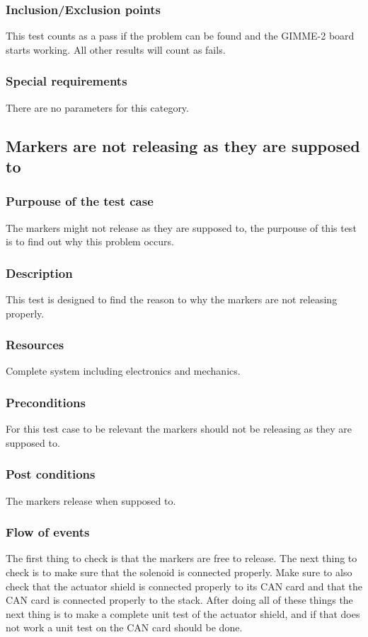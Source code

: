 \documentclass[10pt,a4paper]{article}
\begin{document}
\subsubsection*{Inclusion/Exclusion points}
This test counts as a pass if the problem can be found and the GIMME-2 board starts working. All other results will count as fails. 
\subsubsection*{Special requirements}
There are no parameters for this category. 

\subsection{Markers are not releasing as they are supposed to}
\subsubsection*{Purpouse of the test case}
The markers might not release as they are supposed to, the purpouse of this test is to find out why this problem occurs. 
\subsubsection*{Description}
This test is designed to find the reason to why the markers are not releasing properly. 
\subsubsection*{Resources}
Complete system including electronics and mechanics.  
\subsubsection*{Preconditions}
For this test case to be relevant the markers should not be releasing as they are supposed to. 
\subsubsection*{Post conditions}
The markers release when supposed to. 
\subsubsection*{Flow of events}
The first thing to check is that the markers are free to release. The next thing to check is to make sure that the solenoid is connected properly. Make sure to also check that the actuator shield is connected properly to its CAN card and that the CAN card is connected properly to the stack. After doing all of these things the next thing is to make a complete unit test of the actuator shield, and if that does not work a unit test on the CAN card should be done.
\end{document}
